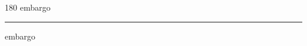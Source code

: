 
\begin{frame}
\begin{center}
\begin{turn}{180}
{\fontsize{2.5cm}{1em}\selectfont embargo}
\end{turn}
\vspace{1em}\par  
\hrule
\vspace{1em}\par  
{\fontsize{2.5cm}{1em}\selectfont embargo}
\end{center}
\end{frame}
